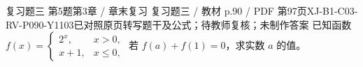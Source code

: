 \par\noindent\begin{minipage}{\linewidth}
\begin{bankitem}{复习题三 第5题}{第3章 / 章末复习 复习题三 / 教材 p.90 / PDF 第97页}{XJ-B1-C03-RV-P090-Y1103}{已对照原页转写题干及公式；待教师复核；未制作答案}
已知函数 $f(x)=\begin{cases}2^x,&x>0,\\x+1,&x\le0,\end{cases}$ 若 $f(a)+f(1)=0$，求实数 $a$ 的值。
\end{bankitem}
\end{minipage}\par\medskip
